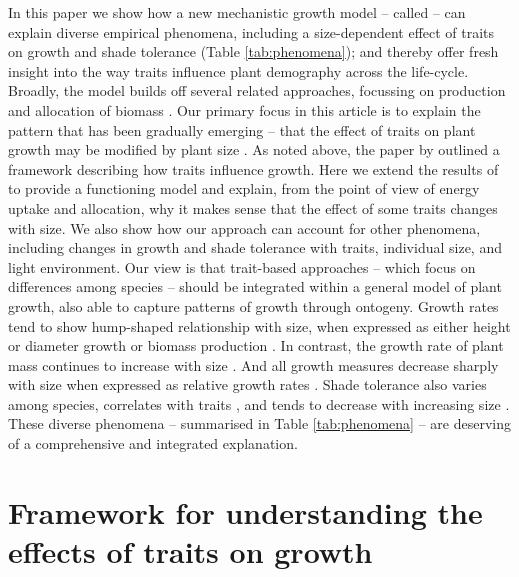 \documentclass[a4paper,11pt]{article}
\begin{document}
In this paper we show how a new mechanistic growth model -- called {\plant} \citep{Falster-2016} -- can explain diverse empirical phenomena, including a size-dependent effect of traits on growth and shade tolerance (Table \ref{tab:phenomena}); and thereby offer fresh insight into the way traits influence plant demography across the life-cycle. Broadly, the {\plant} model builds off several related approaches, focussing on production and allocation of biomass \citep[e.g.][]{Givnish-1988, Yokozawa-1995,Makela-1997, Moorcroft-2001, Sitch-2008, Falster-2011, King-2011}. Our primary focus in this article is to explain the pattern that has been gradually emerging -- that the effect of traits on plant growth may be modified by plant size \citep{Ruger-2012, Iida-2014, Gibert-2016}. As noted above, the paper by \citet{Gibert-2016} outlined a framework describing how traits influence growth. Here we extend the results of \citet{Gibert-2016} to provide a functioning model and explain, from the point of view of energy uptake and allocation, why it makes sense that the effect of some traits changes with size. We also show how our approach can account for other phenomena, including changes in growth and shade tolerance with traits, individual size, and light environment. Our view is that trait-based approaches -- which focus on differences among species -- should be integrated within a general model of plant growth, also able to capture patterns of growth through ontogeny. Growth rates tend to show hump-shaped relationship with size, when expressed as either height \citep{Sillett-2010, King-2011} or diameter growth \citep{Herault-2011} or biomass production \citep{Givnish-1988, Koch-2004}. In contrast, the growth rate of plant mass continues to increase with size \citep{Sillett-2010, Stephenson-2014}. And all growth measures decrease sharply with size when expressed as relative growth rates \citep{Rees-2010, Iida-2014}. Shade tolerance also varies among species, correlates with traits \citep{Lusk-2008,Poorter-2006}, and tends to decrease with increasing size \citep{Givnish-1988, Lusk-2008}. These diverse phenomena -- summarised in Table \ref{tab:phenomena} -- are deserving of a comprehensive and integrated explanation.

\section{Framework for understanding the effects of traits on growth}
\end{document}
